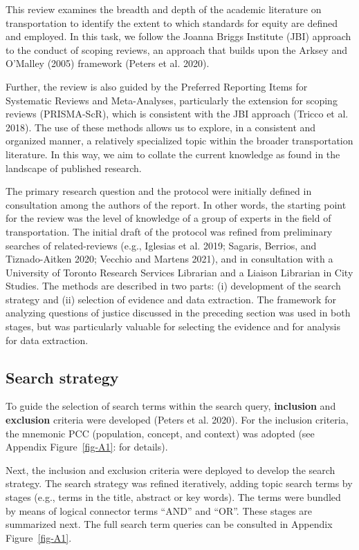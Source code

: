 \documentclass[12pt, oneside]{report}
\begin{document}
This review examines the breadth and depth of the academic literature on
transportation to identify the extent to which standards for equity are
defined and employed. In this task, we follow the Joanna Briggs
Institute (JBI) approach to the conduct of scoping reviews, an approach
that builds upon the Arksey and O'Malley (2005) framework (Peters et al.
2020).

Further, the review is also guided by the Preferred Reporting Items for
Systematic Reviews and Meta-Analyses, particularly the extension for
scoping reviews (PRISMA-ScR), which is consistent with the JBI approach
(Tricco et al. 2018). The use of these methods allows us to explore, in
a consistent and organized manner, a relatively specialized topic within
the broader transportation literature. In this way, we aim to collate
the current knowledge as found in the landscape of published research.

The primary research question and the protocol were initially defined in
consultation among the authors of the report. In other words, the
starting point for the review was the level of knowledge of a group of
experts in the field of transportation. The initial draft of the
protocol was refined from preliminary searches of related-reviews (e.g.,
Iglesias et al. 2019; Sagaris, Berrios, and Tiznado-Aitken 2020; Vecchio
and Martens 2021), and in consultation with a University of Toronto
Research Services Librarian and a Liaison Librarian in City Studies. The
methods are described in two parts: (i) development of the search
strategy and (ii) selection of evidence and data extraction. The
framework for analyzing questions of justice discussed in the preceding
section was used in both stages, but was particularly valuable for
selecting the evidence and for analysis for data extraction.

\hypertarget{search-strategy}{%
\subsection{Search strategy}\label{search-strategy}}

To guide the selection of search terms within the search query,
\textbf{inclusion} and \textbf{exclusion} criteria were developed
(Peters et al. 2020). For the inclusion criteria, the mnemonic PCC
(population, concept, and context) was adopted (see Appendix
Figure~\ref{fig-A1}: for details).

Next, the inclusion and exclusion criteria were deployed to develop the
search strategy. The search strategy was refined iteratively, adding
topic search terms by stages (e.g., terms in the title, abstract or key
words). The terms were bundled by means of logical connector terms
``AND'' and ``OR''. These stages are summarized next. The full search
term queries can be consulted in Appendix Figure~\ref{fig-A1}.
\end{document}
